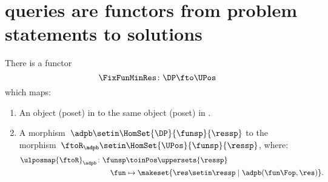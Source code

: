 \section[Queries as functors]{\DP queries are functors from problem statements to solutions}

\begin{lemma}
    \label{lem:covfunctor}
    There is a functor
    \begin{equation}
        \FixFunMinRes\colon \DP \fto \UPos
    \end{equation}
    which maps:
    \begin{enumerate}
        \item An object (poset) in \DP to the same object (poset) in \UPos.
        \item A morphism~$\adpb\setin \HomSet{\DP}{\funsp}{\ressp}$ to the morphism~$\ftoR_{\adpb}\setin \HomSet{\UPos}{\funsp}{\ressp}$, where:
              \begin{equation}
                  \begin{aligned}
                      \ulposmap{\ftoR}_{\adpb}\colon \funsp & \toinPos \uppersets{\ressp} \\
                      \fun                                  & \mapsto \makeset{\res \setin \ressp\mid \adpb(\fun\Fop,\res)}.
                  \end{aligned}
              \end{equation}
    \end{enumerate}
\end{lemma}

